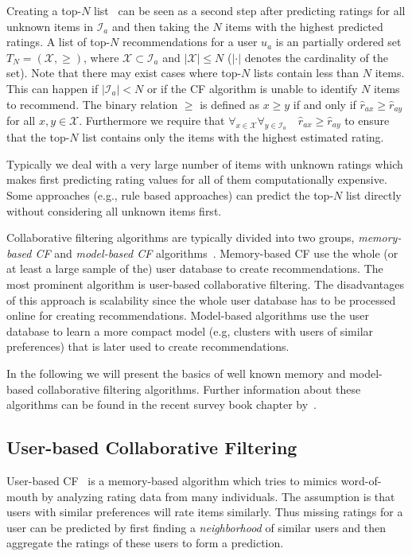 \documentclass[nojss]{jss}
\newcommand{\set}[1]{\mathcal{#1}}
\begin{document}
Creating a top-$N$ list~\citep{recommender:Sarwar:2001} can
be seen as a second step after predicting ratings for all
unknown items in $\set{I}_a$
and then taking the $N$ items with the highest predicted ratings.
A list
of top-$N$ recommendations for a user $u_a$ is an partially ordered set
$T_N = (\set{X}, \ge)$, where
$\set{X} \subset \set{I}_a$ and
$|\set{X}| \le N$ ($|\cdot|$ denotes the cardinality of the set).
Note that there may exist cases
where top-$N$ lists contain less than $N$ items. This can happen if
$|\set{I}_a| < N$ or if the CF algorithm is unable to
identify $N$ items to recommend.
The binary relation $\ge$ is defined as
$x\ge y$ if and only if
$\hat{r}_{ax} \ge
\hat{r}_{ay}$ for all $x,y \in \set{X}$. Furthermore we
require that $\forall_{x\in \set{X}} \forall_{y\in \set{I}_a} \quad \hat{r}_{ax} \ge \hat{r}_{ay}$ to ensure that the top-$N$ list contains
only the items with the highest estimated rating.

Typically we deal with a very large number of items
with unknown ratings
which makes first predicting rating values for all of them computationally
expensive.
Some approaches (e.g., rule based approaches) can
predict the top-$N$ list directly without considering all unknown items first.

Collaborative filtering algorithms are typically divided into two groups,
\emph{memory-based CF} and \emph{model-based CF}
algorithms~\citep{recommender:Breese:1998}. Memory-based CF
use the whole (or at least a large sample of the) user database to create
recommendations. The most prominent algorithm is
user-based collaborative filtering.
The disadvantages of this approach is scalability since the whole
user database has to be processed online for creating recommendations.
Model-based algorithms
use the user database to learn a more compact model (e.g, clusters
with users of similar preferences) that is later used to create
recommendations.

In the following we will present the basics of well known memory and model-based
collaborative filtering algorithms. Further information about
these algorithms can be found in the recent
survey book chapter by~\cite{recommender:Desrosiers:2011}.

\subsection{User-based Collaborative Filtering}

User-based CF~\citep{recommender:Goldberg:1992,Resnick:1994,recommender:Shardanand:1995} is
a memory-based algorithm which tries to mimics word-of-mouth by analyzing
rating data from many individuals. The assumption is that
users with similar preferences will rate items similarly. Thus
missing ratings for a user can be predicted by first
finding a \emph{neighborhood} of similar users and then aggregate the
ratings of these users to form a prediction.
\end{document}
